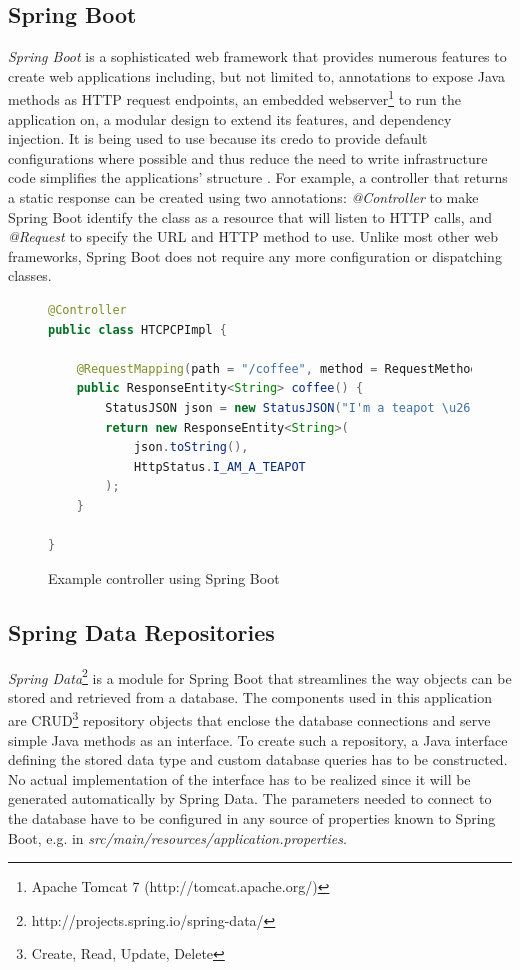 \newpage

\subsection{Spring Boot}
\textit{Spring Boot} is a sophisticated web framework that provides numerous features to create web applications including, but not limited to, annotations to expose Java methods as HTTP request endpoints, an embedded webserver\footnote{Apache Tomcat 7 (http://tomcat.apache.org/)} to run the application on, a modular design to extend its features, and dependency injection. It is being used to use because its credo to provide default configurations where possible and thus reduce the need to write infrastructure code simplifies the applications' structure \cite[p. 6]{SpringGuide}.
For example, a controller that returns a static response can be created using two annotations:
\textit{@Controller} to make Spring Boot identify the class as a resource that will listen to HTTP calls, and \textit{@Request} to specify the URL and HTTP method to use. Unlike most other web frameworks, Spring Boot does not require any more configuration or dispatching classes.

\begin{figure}[h]
\begin{lstlisting}[language=Java]
@Controller
public class HTCPCPImpl {

	@RequestMapping(path = "/coffee", method = RequestMethod.GET)
	public ResponseEntity<String> coffee() {
		StatusJSON json = new StatusJSON("I'm a teapot \u2615");
		return new ResponseEntity<String>(
			json.toString(),
			HttpStatus.I_AM_A_TEAPOT
		);
	}

}
\end{lstlisting}
\caption[Code: Example Controller]{Example controller using Spring Boot}
\end{figure}

\newpage


\subsection{Spring Data Repositories}
\textit{Spring Data}\footnote{http://projects.spring.io/spring-data/} is a module for Spring Boot that streamlines the way objects can be stored and retrieved from a database. The components used in this application are CRUD\footnote{Create, Read, Update, Delete} repository objects that enclose the database connections and serve simple Java methods as an interface. To create such a repository, a Java interface defining the stored data type and custom database queries has to be constructed.
No actual implementation of the interface has to be realized since it will be generated automatically by Spring Data.
The parameters needed to connect to the database have to be configured in any source of properties known to Spring Boot, e.g. in \textit{src/main/resources/application.properties}.

